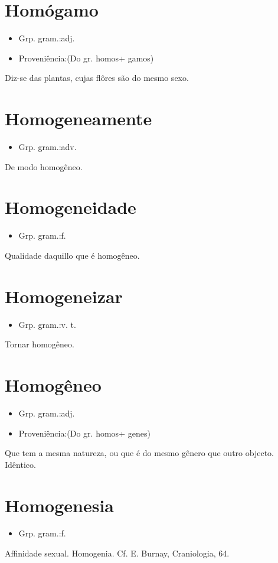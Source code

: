 \documentclass{article}
\begin{document}
\section{Homógamo}
\begin{itemize}
\item {Grp. gram.:adj.}
\end{itemize}
\begin{itemize}
\item {Proveniência:(Do gr. \textunderscore homos\textunderscore  + \textunderscore gamos\textunderscore )}
\end{itemize}
Diz-se das plantas, cujas flôres são do mesmo sexo.
\section{Homogeneamente}
\begin{itemize}
\item {Grp. gram.:adv.}
\end{itemize}
De modo homogêneo.
\section{Homogeneidade}
\begin{itemize}
\item {Grp. gram.:f.}
\end{itemize}
Qualidade daquillo que é homogêneo.
\section{Homogeneizar}
\begin{itemize}
\item {Grp. gram.:v. t.}
\end{itemize}
Tornar homogêneo.
\section{Homogêneo}
\begin{itemize}
\item {Grp. gram.:adj.}
\end{itemize}
\begin{itemize}
\item {Proveniência:(Do gr. \textunderscore homos\textunderscore  + \textunderscore genes\textunderscore )}
\end{itemize}
Que tem a mesma natureza, ou que é do mesmo gênero que outro objecto.
Idêntico.
\section{Homogenesia}
\begin{itemize}
\item {Grp. gram.:f.}
\end{itemize}
Affinidade sexual.
Homogenia. Cf. E. Burnay, \textunderscore Craniologia\textunderscore , 64.
\end{document}
